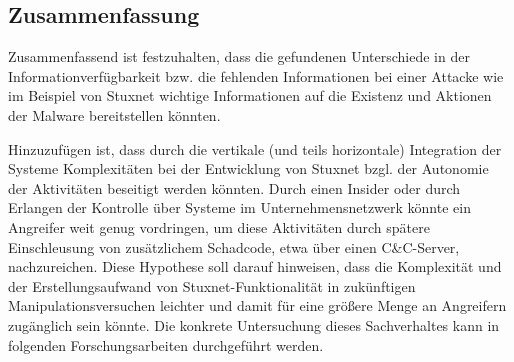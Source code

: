 \subsection{Zusammenfassung}
Zusammenfassend ist festzuhalten, dass die gefundenen Unterschiede in der Informationverfügbarkeit bzw. die fehlenden Informationen bei einer Attacke wie im Beispiel von Stuxnet wichtige Informationen auf die Existenz und Aktionen der Malware  bereitstellen könnten. 

Hinzuzufügen ist, dass durch die vertikale (und teils horizontale) Integration der Systeme Komplexitäten bei der Entwicklung von Stuxnet bzgl. der Autonomie der Aktivitäten beseitigt werden könnten. Durch einen Insider oder durch Erlangen der Kontrolle über Systeme im Unternehmensnetzwerk könnte ein Angreifer weit genug vordringen, um diese Aktivitäten durch spätere Einschleusung von zusätzlichem Schadcode, etwa über einen C\&C-Server, \glqq nachzureichen\grqq . Diese Hypothese soll darauf hinweisen, dass die Komplexität und der Erstellungsaufwand von Stuxnet-Funktionalität in zukünftigen Manipulationsversuchen leichter und damit für eine größere Menge an Angreifern zugänglich sein könnte. Die konkrete Untersuchung dieses Sachverhaltes kann in folgenden Forschungsarbeiten durchgeführt werden. 